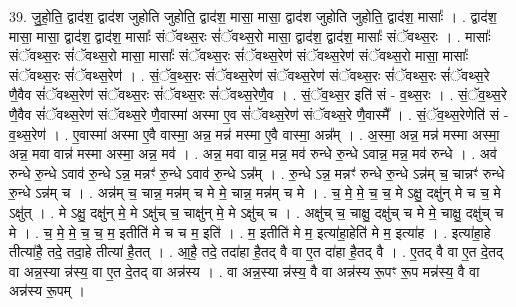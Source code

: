 \documentclass[17pt]{extarticle}
\begin{document}
39. जु॒हो॒ति॒ द्वाद॑श॒ द्वाद॑श जुहोति जुहोति॒ द्वाद॑श॒ मासा॒ मासा॒ द्वाद॑श जुहोति जुहोति॒ द्वाद॑श॒ मासाः᳚ । . द्वाद॑श॒ मासा॒ मासा॒ द्वाद॑श॒ द्वाद॑श॒ मासाः᳚ संॅवथ्स॒रः सं॑ॅवथ्स॒रो मासा॒ द्वाद॑श॒ द्वाद॑श॒ मासाः᳚ संॅवथ्स॒रः । . मासाः᳚ संॅवथ्स॒रः सं॑ॅवथ्स॒रो मासा॒ मासाः᳚ संॅवथ्स॒रः सं॑ॅवथ्स॒रेण॑ संॅवथ्स॒रेण॑ संॅवथ्स॒रो मासा॒ मासाः᳚ संॅवथ्स॒रः सं॑ॅवथ्स॒रेण॑ । . सं॒ॅव॒थ्स॒रः सं॑ॅवथ्स॒रेण॑ संॅवथ्स॒रेण॑ संॅवथ्स॒रः सं॑ॅवथ्स॒रः सं॑ॅवथ्स॒रे णै॒वैव सं॑ॅवथ्स॒रेण॑ संॅवथ्स॒रः सं॑ॅवथ्स॒रः सं॑ॅवथ्स॒रेणै॒व । . सं॒ॅव॒थ्स॒र इति॑ सं - व॒थ्स॒रः । . सं॒ॅव॒थ्स॒रे णै॒वैव सं॑ॅवथ्स॒रेण॑ संॅवथ्स॒रे णै॒वास्मा॑ अस्मा ए॒व सं॑ॅवथ्स॒रेण॑ संॅवथ्स॒रे णै॒वास्मै᳚ । . सं॒ॅव॒थ्स॒रेणेति॑ सं - व॒थ्स॒रेण॑ । . ए॒वास्मा॑ अस्मा ए॒वै वास्मा॒ अन्न॒ मन्न॑ मस्मा ए॒वै वास्मा॒ अन्न᳚म् । . अ॒स्मा॒ अन्न॒ मन्न॑ मस्मा अस्मा॒ अन्न॒ मवा वान्न॑ मस्मा अस्मा॒ अन्न॒ मव॑ । . अन्न॒ मवा वान्न॒ मन्न॒ मव॑ रुन्धे रु॒न्धे ऽवान्न॒ मन्न॒ मव॑ रुन्धे । . अव॑ रुन्धे रु॒न्धे ऽवाव॑ रु॒न्धे ऽन्न॒ मन्नꣳ॑ रु॒न्धे ऽवाव॑ रु॒न्धे ऽन्न᳚म् । . रु॒न्धे ऽन्न॒ मन्नꣳ॑ रुन्धे रु॒न्धे ऽन्न॑म् च॒ चान्नꣳ॑ रुन्धे रु॒न्धे ऽन्न॑म् च । . अन्न॑म् च॒ चान्न॒ मन्न॑म् च मे मे॒ चान्न॒ मन्न॑म् च मे । . च॒ मे॒ मे॒ च॒ च॒ मे ऽक्षु॒ दक्षु॑न् मे च च॒ मे ऽक्षु॑त् । . मे ऽक्षु॒ दक्षु॑न् मे॒ मे ऽक्षु॑च् च॒ चाक्षु॑न् मे॒ मे ऽक्षु॑च् च । . अक्षु॑च् च॒ चाक्षु॒ दक्षु॑च् च मे मे॒ चाक्षु॒ दक्षु॑च् च मे । . च॒ मे॒ मे॒ च॒ च॒ म॒ इतीति॑ मे च च म॒ इति॑ । . म॒ इतीति॑ मे म॒ इत्या॑हा॒हेति॑ मे म॒ इत्या॑ह । . इत्या॑हा॒हे तीत्या॑है॒ तदे॒ तदा॒हे तीत्या॑ है॒तत् । . आ॒है॒ तदे॒ तदा॑हा है॒तद् वै वा ए॒त दा॑हा है॒तद् वै । . ए॒तद् वै वा ए॒त दे॒तद् वा अन्न॒स्या न्न॑स्य॒ वा ए॒त दे॒तद् वा अन्न॑स्य । . वा अन्न॒स्या न्न॑स्य॒ वै वा अन्न॑स्य रू॒पꣳ रू॒प मन्न॑स्य॒ वै वा अन्न॑स्य रू॒पम् । \newline
\pagebreak
{}
\end{document}
